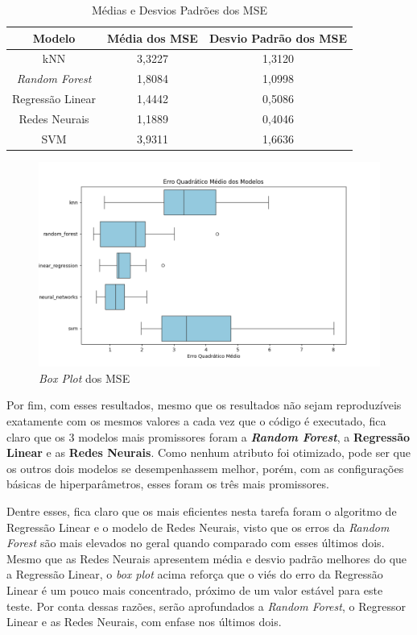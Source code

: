 \documentclass{report}
\begin{document}
\begin{table}[h!]
  \centering
  \begin{tabular}{| c | c | c |}
      \hline
      \rowcolor{lightgray}
      \textbf{Modelo} & \textbf{Média dos MSE} & \textbf{Desvio Padrão dos MSE} \\
      \hline
      kNN & 3,3227 & 1,3120 \\
      \hline
      \textit{Random Forest} & 1,8084 & 1,0998 \\
      \hline
      Regressão Linear & 1,4442 & 0,5086 \\
      \hline
      Redes Neurais & 1,1889 & 0,4046 \\
      \hline
      SVM & 3,9311 & 1,6636 \\
      \hline
  \end{tabular}
  \caption{\label{table:model_summary} Médias e Desvios Padrões dos MSE}
\end{table}

\begin{figure}[h!]
  \centering
  \includegraphics[width=.85\linewidth]{images/plots/box_plots/mse.png}
  \caption{\label{img:mse_boxplot} \textit{Box Plot} dos MSE}
\end{figure}

Por fim, com esses resultados, mesmo que os resultados não sejam reproduzíveis exatamente com os mesmos valores a cada vez que o código é executado, fica claro que os 3 modelos mais promissores foram
a \textbf{\textit{Random Forest}}, a \textbf{Regressão Linear} e as \textbf{Redes Neurais}. Como nenhum atributo foi otimizado, pode ser que os outros dois modelos se desempenhassem melhor, porém, com
as configurações básicas de hiperparâmetros, esses foram os três mais promissores.

Dentre esses, fica claro que os mais eficientes nesta tarefa foram o algoritmo de Regressão Linear e o modelo de Redes Neurais, visto que os erros da \textit{Random Forest} são mais elevados no geral quando
comparado com esses últimos dois. Mesmo que as Redes Neurais apresentem média e desvio padrão melhores do que a Regressão Linear, o \textit{box plot} acima reforça que o viés do erro da Regressão Linear é um
pouco mais concentrado, próximo de um valor estável para este teste. Por conta dessas razões, serão aprofundados a \textit{Random Forest}, o Regressor Linear e as Redes Neurais, com enfase nos últimos dois.
\end{document}
